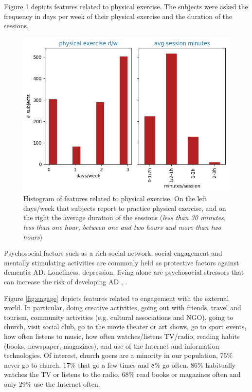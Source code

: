 \documentclass[11pt]{article}
\theoremstyle{definition}
\theoremstyle{remark}
\begin{document}
Figure \ref{fig:phys} depicts features related to physical exercise. The subjects were asked the frequency in days per week of their physical exercise and the duration of the sessions.
\begin{figure}[H]
        \centering
        \includegraphics[keepaspectratio, width=0.6\linewidth]{figures/Fig_phys}
        \caption{Histogram of features related to physical exercise. On the left days/week that subjects report to practice physical exercise, and on the right the average duration of the sessions (\emph{less than 30 minutes, less than one hour, between one and two hours and more than two hours})} 
        \label{fig:phys}
\end{figure}


Psychosocial factors such as a rich social network, social engagement and mentally stimulating activities are commonly held as protective factors against dementia AD. Loneliness, depression, living alone are psychosocial stressors that can increase the risk of developing AD \cite{johansson2013common}, \cite{sindi2015advances}. 

Figure \ref{fig:engage} depicts features related to engagement with the external world. In particular, doing creative activities, going out with friends, travel and tourism, community activities (e.g. cultural associations and NGO), going to church, visit social club, go to the movie theater or art shows, go to sport events, how often listens to music, how often watches/listens TV/radio, reading habits (books, newspaper, magazines), and use of the Internet and information technologies.
Of interest, church goers are a minority in our population, $75\%$ never go to church, $17\%$ that go a few times and $8\%$ go often. $86\%$ habitually watches the TV or listens to the radio, $68\%$ read books or magazines often and only $29\%$ use the Internet often.
\end{document}
